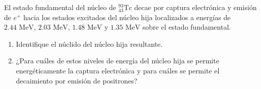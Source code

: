 \item El estado fundamental del núcleo de $^{93}_{43}\text{Tc}$ decae por captura electrónica y emisión de $e^+$ hacia los estados excitados del núcleo hija localizados a energías de $2.44\text{ MeV}$, $2.03\text{ MeV}$, $1.48\text{ MeV}$ y $1.35\text{ MeV}$ sobre el estado fundamental.
\begin{enumerate}
    \item Identifique el núclido del núcleo hija resultante.
    \item ¿Para cuáles de estos niveles de energía del núcleo hija se permite energéticamente la captura electrónica y para cuáles se permite el decaimiento por emisión de positrones?
\end{enumerate}